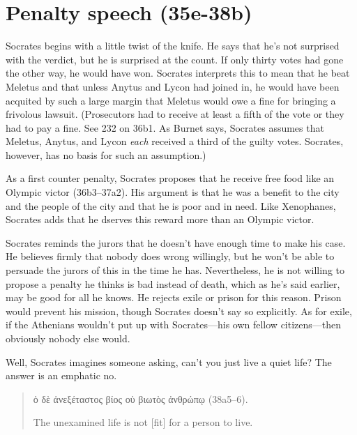\documentclass[11pt]{article}
\begin{document}


\section{Penalty speech (35e-38b)}

Socrates begins with a little twist of the knife.  He says that he's not surprised with the verdict, but he is surprised at the count. If only thirty votes had gone the other way, he would have won.  Socrates interprets this to mean that he beat Meletus and that unless Anytus and Lycon had joined in, he would have been acquited by such a large margin that Meletus would owe a fine for bringing a frivolous lawsuit.  (Prosecutors had to receive at least a fifth of the vote or they had to pay a fine.  See \citet{burnet1924} 232 on 36b1. As Burnet says, Socrates assumes that Meletus, Anytus, and Lycon \textit{each} received a third of the guilty votes.  Socrates, however, has no basis for such an assumption.)

As a first counter penalty, Socrates proposes that he receive free food like an Olympic victor (36b3--37a2).  His argument is that he was a benefit to the city and the people of the city and that he is poor and in need.  Like Xenophanes, Socrates adds that he dserves this reward more than an Olympic victor.

Socrates reminds the jurors that he doesn't have enough time to make his case.  He believes firmly that nobody does wrong willingly, but he won't be able to persuade the jurors of this in the time he has.  Nevertheless, he is not willing to propose a penalty he thinks is bad instead of death, which as he's said earlier, may be good for all he knows.  He rejects exile or prison for this reason.  Prison would prevent his mission, though Socrates doesn't say so explicitly.  As for exile, if the Athenians wouldn't put up with Socrates---his own fellow citizens---then obviously nobody else would.

Well, Socrates imagines someone asking, can't you just live a quiet life?  The answer is an emphatic no.

\begin{quote}

    {\g
    ὁ δὲ ἀνεξέταστος βίος οὐ βιωτὸς ἀνθρώπῳ
    } (38a5--6).

    The unexamined life is not [fit] for a person to live.

\end{quote}
\end{document}
